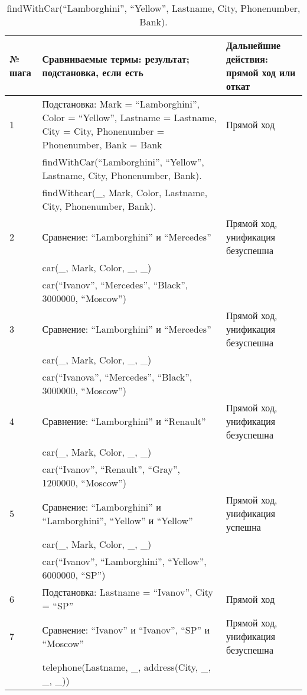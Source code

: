 {
\small
\begin{longtable}{|p{1.15cm}|p{8cm}|p{8cm}|}
    \caption{findWithCar(``Lamborghini'', ``Yellow'', Lastname, City, Phonenumber, Bank).} \\
    \hline
    № шага & Сравниваемые термы: результат; подстановка, если есть & Дальнейшие действия: прямой ход или откат \\
    \hline
    1 & Подстановка: Mark = ``Lamborghini'', Color = ``Yellow'', Lastname = Lastname, City = City, Phonenumber = Phonenumber, Bank = Bank & Прямой ход \\
      & findWithCar(``Lamborghini'', ``Yellow'', Lastname, City, Phonenumber, Bank). & \\
      & findWithcar(\_, Mark, Color, Lastname, City, Phonenumber, Bank). & \\
    \hline
    2 & Сравнение: ``Lamborghini'' и ``Mercedes'' & Прямой ход, унификация безуспешна \\
      & car(\_, Mark, Color, \_, \_) & \\
      & car(``Ivanov'', ``Mercedes'', ``Black'', 3000000, ``Moscow'') & \\
    \hline
    3 & Сравнение: ``Lamborghini'' и ``Mercedes'' & Прямой ход, унификация безуспешна \\
      & car(\_, Mark, Color, \_, \_) & \\
      & car(``Ivanova'', ``Mercedes'', ``Black'', 3000000, ``Moscow'') & \\
    \hline
    4 & Сравнение: ``Lamborghini'' и ``Renault'' & Прямой ход, унификация безуспешна \\
      & car(\_, Mark, Color, \_, \_) & \\
      & car(``Ivanov'', ``Renault'', ``Gray'', 1200000, ``Moscow'') & \\
    \hline
    5 & Сравнение: ``Lamborghini'' и ``Lamborghini'', ``Yellow'' и ``Yellow'' & Прямой ход, унификация успешна \\
      & car(\_, Mark, Color, \_, \_) & \\
      & car(``Ivanov'', ``Lamborghini'', ``Yellow'', 6000000, ``SP'') & \\
    \hline
    6 & Подстановка: Lastname = ``Ivanov'', City = ``SP'' & Прямой ход \\
    \hline
    7 & Сравнение: ``Ivanov'' и ``Ivanov'', ``SP'' и ``Moscow'' & Прямой ход, унификация безуспешна \\
      & telephone(Lastname, \_, address(City, \_, \_, \_)) & \\

\end{longtable}}
